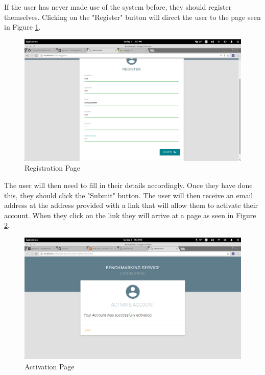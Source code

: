 \documentclass[11pt,a4paper]{article}
\begin{document}
If the user has never made use of the system before, they should register themselves. Clicking on the "Register"
button will direct the user to the page seen in Figure \ref{fig:regPage}.
\begin{figure}[H]
	\begin{center}
		\includegraphics[scale=0.3]{../Images/User Manual/Registration Page.png}
		\caption{Registration Page}
		\label{fig:regPage}
	\end{center}  
\end{figure}

The user will then need to fill in their details accordingly. Once they have done this, they should click the "Submit" 
button. The user will then receive an email address at the address provided with a link that will allow them to activate
their account. When they click on the link they will arrive at a page as seen in Figure \ref{fig:activatePage}.
\begin{figure}[H]
	\begin{center}
		\includegraphics[scale=0.3]{../Images/User Manual/Activation Page.png}
		\caption{Activation Page}
		\label{fig:activatePage}
	\end{center}  
\end{figure}
\end{document}
